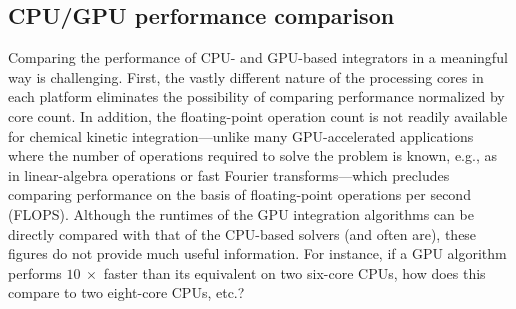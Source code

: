 \documentclass[preprint,review,11pt]{elsarticle}
\begin{document}

\subsection{CPU\slash GPU performance comparison}

Comparing the performance of CPU- and GPU-based integrators in a meaningful way is challenging.
First, the vastly different nature of the processing cores in each platform eliminates the possibility of comparing performance normalized by core count.
In addition, the floating-point operation count is not readily available for chemical kinetic integration---unlike many GPU-accelerated applications where the number of operations required to solve the problem is known, e.g., as in linear-algebra operations or fast Fourier transforms---which precludes comparing performance on the basis of floating-point operations per second (FLOPS).
Although the runtimes of the GPU integration algorithms can be directly compared with that of the CPU-based solvers (and often are), these figures do not provide much useful information.
For instance, if a GPU algorithm performs $\SI{10}{\times}$ faster than its equivalent on two six-core CPUs, how does this compare to two eight-core CPUs, etc.?
\end{document}
